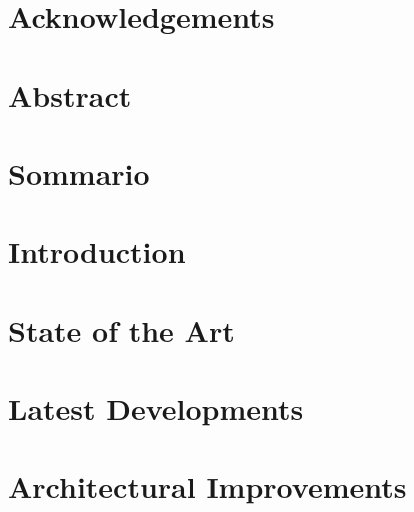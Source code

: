 \documentclass[12pt,a4paper,twoside,openright]{memoir}
\theoremstyle{definition}
\begin{document}
\nonzeroparskip
\frontmatter

%
\chapter*{Acknowledgements}

\newpage
\tableofcontents
\cleardoublepage
\listoffigures
\listoftables
\mainmatter
\pagestyle {ruled}
\chapter*{Abstract}

\chapter*{Sommario}

\chapter{Introduction}
\label{chap:intro}

\chapter{State of the Art}
\label{chap:sota}

\chapter{Latest Developments}
\label{chap:latdel}

\chapter{Architectural Improvements}
\label{chap:arim}

\end{document}
